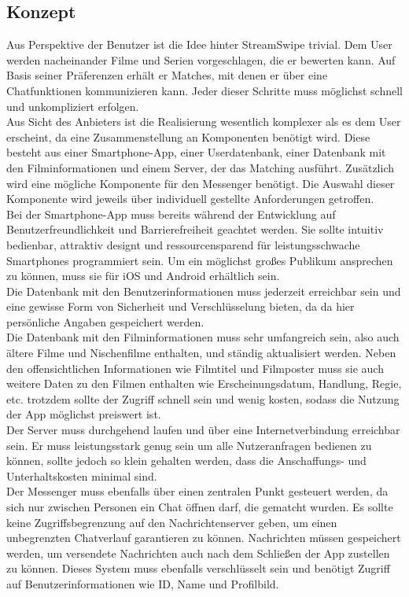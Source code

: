 \subsection{Konzept}
Aus Perspektive der Benutzer ist die Idee hinter StreamSwipe trivial. Dem User werden nacheinander Filme und Serien vorgeschlagen, die er bewerten kann. Auf Basis seiner Präferenzen erhält er Matches, mit denen er über eine Chatfunktionen kommunizieren kann. Jeder dieser Schritte muss möglichst schnell und unkompliziert erfolgen.\\
Aus Sicht des Anbieters ist die Realisierung wesentlich komplexer als es dem User erscheint, da eine Zusammenstellung an Komponenten benötigt wird.  Diese besteht aus einer Smartphone-App, einer Userdatenbank, einer Datenbank mit den Filminformationen und einem Server, der das Matching ausführt. Zusätzlich wird eine mögliche Komponente für den Messenger benötigt. Die Auswahl dieser Komponente wird jeweils über individuell gestellte Anforderungen getroffen. \\

\noindent
Bei der Smartphone-App muss bereits während der Entwicklung auf Benutzerfreundlichkeit und Barrierefreiheit geachtet werden. Sie sollte intuitiv bedienbar, attraktiv designt und ressourcensparend für leistungsschwache Smartphones programmiert sein. Um ein möglichst großes Publikum ansprechen zu können, muss sie für iOS und Android erhältlich sein.\\
Die Datenbank mit den Benutzerinformationen muss jederzeit erreichbar sein und eine gewisse Form von Sicherheit und Verschlüsselung bieten, da da hier persönliche Angaben gespeichert werden.\\
Die Datenbank mit den Filminformationen  muss sehr umfangreich sein, also auch ältere Filme und Nischenfilme enthalten, und ständig aktualisiert werden. Neben den offensichtlichen Informationen wie Filmtitel und Filmposter muss sie auch weitere Daten zu den Filmen enthalten wie Erscheinungsdatum, Handlung, Regie, etc. trotzdem sollte der Zugriff schnell sein und wenig kosten, sodass die Nutzung der App möglichst preiswert ist.\\
Der Server muss durchgehend laufen und über eine Internetverbindung erreichbar sein. Er muss leistungsstark genug sein um alle Nutzeranfragen bedienen zu können, sollte jedoch so klein gehalten werden, dass die Anschaffungs- und Unterhaltskosten minimal sind.\\
Der Messenger  muss ebenfalls über einen zentralen Punkt gesteuert werden, da sich nur zwischen Personen ein Chat öffnen darf, die gematcht wurden. Es sollte keine Zugriffsbegrenzung auf den Nachrichtenserver  geben, um einen unbegrenzten  Chatverlauf garantieren zu können. Nachrichten müssen gespeichert werden, um versendete Nachrichten auch nach dem Schließen der App zustellen zu können. Dieses System muss ebenfalls verschlüsselt sein und benötigt Zugriff auf Benutzerinformationen wie ID, Name und Profilbild. 




